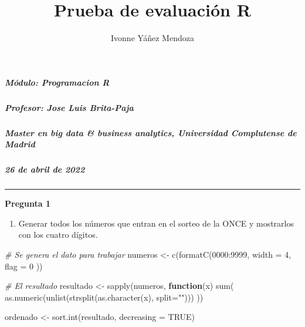 \documentclass[
  12pt,
]{article}
\title{Prueba de evaluación R}
\author{Ivonne Yáñez Mendoza}
\date{}
\newenvironment{Shaded}{\begin{snugshade}}{\end{snugshade}}
\newcommand{\AttributeTok}[1]{\textcolor[rgb]{0.77,0.63,0.00}{#1}}
\newcommand{\CommentTok}[1]{\textcolor[rgb]{0.56,0.35,0.01}{\textit{#1}}}
\newcommand{\ConstantTok}[1]{\textcolor[rgb]{0.00,0.00,0.00}{#1}}
\newcommand{\ControlFlowTok}[1]{\textcolor[rgb]{0.13,0.29,0.53}{\textbf{#1}}}
\newcommand{\DecValTok}[1]{\textcolor[rgb]{0.00,0.00,0.81}{#1}}
\newcommand{\FunctionTok}[1]{\textcolor[rgb]{0.00,0.00,0.00}{#1}}
\newcommand{\NormalTok}[1]{#1}
\newcommand{\OtherTok}[1]{\textcolor[rgb]{0.56,0.35,0.01}{#1}}
\newcommand{\SpecialCharTok}[1]{\textcolor[rgb]{0.00,0.00,0.00}{#1}}
\newcommand{\StringTok}[1]{\textcolor[rgb]{0.31,0.60,0.02}{#1}}
\providecommand{\tightlist}{%
  \setlength{\itemsep}{0pt}\setlength{\parskip}{0pt}}
\begin{document}
\maketitle

\hypertarget{muxf3dulo-programacion-r}{%
\subparagraph{Módulo: Programacion R}\label{muxf3dulo-programacion-r}}

\hypertarget{profesor-jose-luis-brita-paja}{%
\subparagraph{Profesor: Jose Luis
Brita-Paja}\label{profesor-jose-luis-brita-paja}}

\hypertarget{master-en-big-data-business-analytics-universidad-complutense-de-madrid}{%
\subparagraph{Master en big data \& business analytics, Universidad
Complutense de
Madrid}\label{master-en-big-data-business-analytics-universidad-complutense-de-madrid}}

\hypertarget{de-abril-de-2022}{%
\subparagraph{26 de abril de 2022}\label{de-abril-de-2022}}

\begin{center}\rule{0.5\linewidth}{0.5pt}\end{center}

\textbf{Pregunta 1}

\begin{enumerate}
\def\labelenumi{\alph{enumi})}
\tightlist
\item
  Generar todos los números que entran en el sorteo de la ONCE y
  mostrarlos con los cuatro dígitos.
\end{enumerate}

\begin{Shaded}
\begin{Highlighting}[]
\CommentTok{\# Se genera el dato para trabajar}
\NormalTok{numeros }\OtherTok{\textless{}{-}} \FunctionTok{c}\NormalTok{(}\FunctionTok{formatC}\NormalTok{(}\DecValTok{0000}\SpecialCharTok{:}\DecValTok{9999}\NormalTok{, }\AttributeTok{width =} \DecValTok{4}\NormalTok{, }\AttributeTok{flag =} \StringTok{\textquotesingle{}0\textquotesingle{}}\NormalTok{ ))}

\CommentTok{\# El resultado }
\NormalTok{resultado }\OtherTok{\textless{}{-}} \FunctionTok{sapply}\NormalTok{(numeros, }\ControlFlowTok{function}\NormalTok{(x) }
          \FunctionTok{sum}\NormalTok{( }\FunctionTok{as.numeric}\NormalTok{(}\FunctionTok{unlist}\NormalTok{(}\FunctionTok{strsplit}\NormalTok{(}\FunctionTok{as.character}\NormalTok{(x), }\AttributeTok{split=}\StringTok{""}\NormalTok{))) ))}

\NormalTok{ordenado }\OtherTok{\textless{}{-}} \FunctionTok{sort.int}\NormalTok{(resultado, }\AttributeTok{decreasing =} \ConstantTok{TRUE}\NormalTok{)}
\end{Highlighting}
\end{Shaded}
\end{document}
